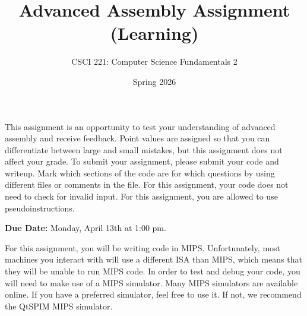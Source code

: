 \documentclass{exam}
\begin{document}
\title{Advanced Assembly Assignment (Learning)}
\author{CSCI 221: Computer Science Fundamentals 2}
\date{Spring 2026}
\maketitle


This assignment is an opportunity to test your understanding of advanced assembly and receive feedback. 
Point values are assigned so that you can differentiate between large and small mistakes, but this assignment does not affect your grade. 
To submit your assignment, please submit your code and writeup. 
Mark which sections of the code are for which questions by using different files or comments in the file. 
For this assignment, your code does not need to check for invalid input. 
For this assignment, you are allowed to use pseudoinstructions. 

\textbf{Due Date:}
Monday, April 13th at 1:00 pm. 

For this assignment, you will be writing code in MIPS. 
Unfortunately, most machines you interact with will use a different ISA than MIPS, which means that they will be unable to run MIPS code. 
In order to test and debug your code, you will need to make use of a MIPS simulator. 
Many MIPS simulators are available online. 
If you have a preferred simulator, feel free to use it. 
If not, we recommend the QtSPIM MIPS simulator. 
\end{document}
